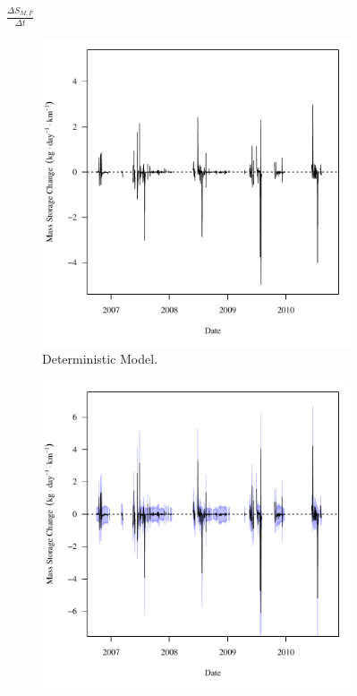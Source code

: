 \subfiguretop
\begin{landscape}
	\begin{figure}
		$ \displaystyle \frac{\Delta S_{M,F}}{\Delta t} $
		\begin{subfigure}{0.7\textwidth}
			\centering
			\includegraphics[width=\tableCustomSize]{"Figures/Results_DSR/Deterministic/f Segment F"}
			\caption{Deterministic Model.}
		\end{subfigure}%
		\begin{subfigure}{0.7\textwidth}
			\centering
			\includegraphics[width=\tableCustomSize]{"Figures/Results_DSR/Stochastic/f Segment F"}

\end{subfigure}
\end{figure}
\end{landscape}

